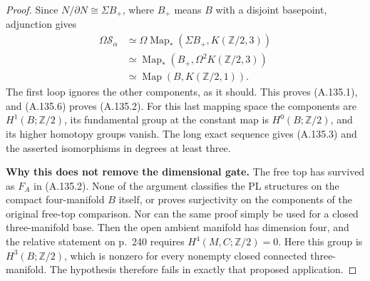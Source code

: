 \begin{proof}
Since $N/\partial N\cong\Sigma B_+$, where $B_+$ means $B$ with a
disjoint basepoint, adjunction gives
\[
 \begin{aligned}
 \Omega\mathcal S_\alpha
 &\simeq\Omega\operatorname{Map}_*(\Sigma B_+,K(\mathbb Z/2,3))\\
 &\simeq\operatorname{Map}_*(B_+,\Omega^2K(\mathbb Z/2,3))\\
 &\simeq\operatorname{Map}(B,K(\mathbb Z/2,1)).
 \end{aligned}                                         \tag{A.135.12}
\]
The first loop ignores the other components, as it should. This proves
(A.135.1), and (A.135.6) proves (A.135.2).
For this last mapping space the components are $H^1(B;\mathbb Z/2)$,
its fundamental group at the constant map is $H^0(B;\mathbb Z/2)$,
and its higher homotopy groups vanish. The long exact sequence gives
(A.135.3) and the asserted isomorphisms in degrees at least three.

\textbf{Why this does not remove the dimensional gate.}
The free top has survived as $F_A$ in (A.135.2). None of the argument
classifies the PL structures on the compact four-manifold $B$ itself,
or proves surjectivity on the components of the original free-top
comparison. Nor can the same proof simply be used for a closed
three-manifold base. Then the open ambient manifold has dimension
four, and the relative statement on p.~240 requires
$H^4(M,C;\mathbb Z/2)=0$. Here this group is
$H^3(B;\mathbb Z/2)$, which is nonzero for every nonempty closed
connected three-manifold. The hypothesis therefore fails in exactly
that proposed application.
\end{proof}

